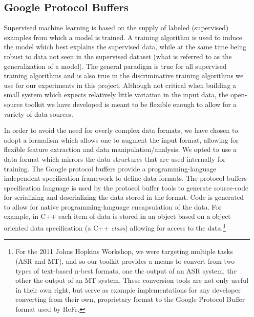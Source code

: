 \documentclass[a4paper]{article}
\begin{document}
\subsection{\label{sub:protobufs}Google Protocol Buffers}

Supervised machine learning is based on the supply of labeled (supervised)
examples from which a model is trained.  A training algorithm is used to induce
the model which best explains the supervised data, while at the same time being
robust to data not seen in the supervised dataset (what is referred to as
the generalization of a model).  The general paradigm is true for all supervised
training algorithms and is also true in the discriminative training algorithms
we use for our experiments in this project. Although not critical when building
a small system which expects relatively little variation in the input data, the
open-source toolkit we have developed is meant to be flexible enough to allow
for a variety of data sources.

In order to avoid the need for overly complex data formats, we have
chosen to adopt a formalism which allows one to augment the input
format, allowing for flexible feature extraction and data manipulation/analysis.
We opted to use a data format which mirrors the data-structures that
are used internally for training. The Google protocol buffers\cite{protobuf}
provide a programming-language independent specification framework
to define data formats. The protocol buffers specification language
is used by the protocol buffer tools to generate source-code for serializing
and deserializing the data stored in the format. Code is generated
to allow for native programming-language encapsulation of the data.
For example, in C++ each item of data is stored in an object based
on a object oriented data specification (a C++ \emph{class}) allowing
for access to the data.\footnote{For the 2011 Johns Hopkins Workshop, we were targeting multiple tasks (ASR and MT), and so our toolkit provides a means to convert from two types of text-based n-best formats, one the output of an ASR system, the other the output of an MT system.  These conversion tools are not only useful in their own right, but serve as example implementations for any developer converting from their own, proprietary format to the Google Protocol Buffer format used by ReFr.}
\end{document}
